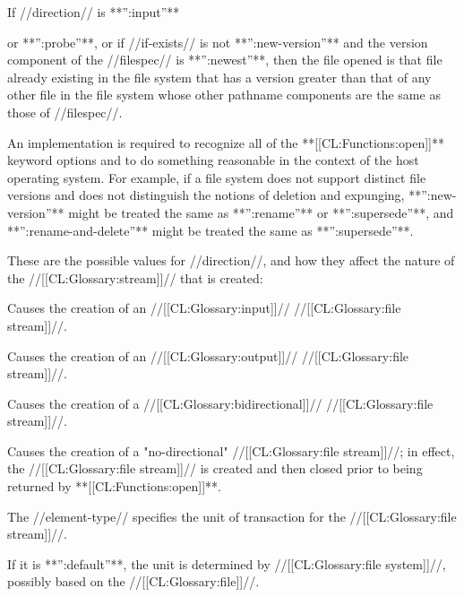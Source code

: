 If //direction// is **'':input''**

or **'':probe''**, or if //if-exists// is not **'':new-version''** and the version component of the //filespec// is **'':newest''**, then the file opened is that file already existing in the file system that has a version greater than that of any other file in the file system whose other pathname components are the same as those of //filespec//.

An implementation is required to recognize all of the **[[CL:Functions:open]]** keyword options and to do something reasonable in the context of the host operating system. For example, if a file system does not support distinct file versions and does not distinguish the notions of deletion and expunging, **'':new-version''** might be treated the same as **'':rename''** or **'':supersede''**, and **'':rename-and-delete''** might be treated the same as **'':supersede''**.

\beginlist


These are the possible values for //direction//, and how they affect the nature of the //[[CL:Glossary:stream]]// that is created:

\beginlist


Causes the creation of an //[[CL:Glossary:input]]// //[[CL:Glossary:file stream]]//.


Causes the creation of an //[[CL:Glossary:output]]// //[[CL:Glossary:file stream]]//.


Causes the creation of a //[[CL:Glossary:bidirectional]]// //[[CL:Glossary:file stream]]//.


Causes the creation of a "no-directional" //[[CL:Glossary:file stream]]//; in effect, the //[[CL:Glossary:file stream]]// is created and then closed prior to being returned by **[[CL:Functions:open]]**.

\endlist


The //element-type// specifies the unit of transaction for the //[[CL:Glossary:file stream]]//.

If it is **'':default''**, the unit is determined by //[[CL:Glossary:file system]]//, possibly based on the //[[CL:Glossary:file]]//.

